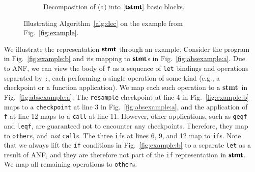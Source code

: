 \documentclass[runningheads]{llncs}
\newcommand{\clstinline}{\lstinline[language=CorePPL]}
\newcommand{\ttt}{\texttt}
\newcommand{\stmt}{\textbf{\textsf{stmt}}}
\newcommand{\tstmt}{\textbf{\textsf{tstmt}}}
\begin{document}
\begin{figure}[tb]
\begin{subfigure}[c]{0.64\columnwidth}
      \caption{Decomposition of (a) into $[\tstmt]$ basic blocks.}
    \label{fig:absexample:b}
  \end{subfigure}
  \caption{%
    Illustrating Algorithm~\ref{alg:dec} on the example from Fig.~\ref{fig:example}.
  }
  \label{fig:absexample}
\end{figure}

We illustrate the representation $\stmt$ through an example.
Consider the program in Fig.~\ref{fig:example:b} and its mapping to $\stmt$s in Fig.~\ref{fig:absexample:a}.
Due to ANF, we can view the body of \lstinline!f! as a sequence of \clstinline!let! bindings and operations separated by \lstinline!;!, each performing a single operation of some kind (e.g., a checkpoint or a function application).
We map each such operation to a \stmt\ in Fig.~\ref{fig:absexample:a}.
The \clstinline!resample! checkpoint at line 4 in Fig.~\ref{fig:example:b} maps to a \ttt{checkpoint} at line 3 in Fig.~\ref{fig:absexample:a}, and the application of \lstinline!f! at line 12 maps to a \texttt{call} at line 11.
However, other applications, such as \lstinline!geqf! and \lstinline!leqf!, are guaranteed not to encounter any checkpoints.
Therefore, they map to \ttt{other}s, and \emph{not} \ttt{call}s.
The three \clstinline!if!s at lines 6, 9, and 12 map to \ttt{if}s.
Note that we always lift the \clstinline!if! conditions in Fig.~\ref{fig:example:b} to a separate \clstinline!let! as a result of ANF, and they are therefore not part of the \ttt{if} representation in $\stmt$.
We map all remaining operations to \ttt{other}s.
\end{document}
